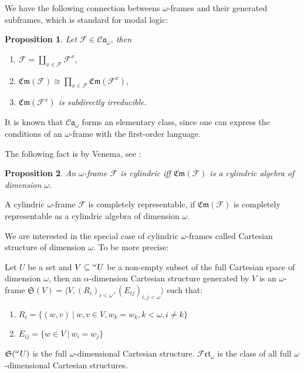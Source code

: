 \documentclass[a4paper]{article}
\theoremstyle{defin}
\theoremstyle{theorem}
\theoremstyle{claim}
\theoremstyle{prop}
\newtheorem{prop}{Proposition}
\theoremstyle{lemma}
\theoremstyle{fact}
\theoremstyle{ex}
\theoremstyle{col}
\begin{document}
We have the following connection betweens $\omega$-frames and their generated subframes, which is standard for modal logic:
\begin{prop}
Let $\mathcal{F} \in \mathcal{C}\mathfrak{a}_{\omega}$, then
\begin{enumerate}
\item $\mathcal{F} = \coprod \limits_{x \in \mathcal{F}} \mathcal{F}^{x}$,
\item $\mathfrak{Cm}(\mathcal{F}) \cong \prod \limits_{x \in \mathcal{F}} \mathfrak{Cm}(\mathcal{F}^{x})$,
\item $\mathfrak{Cm}(\mathcal{F}^{x})$ is subdirectly irreducible.
\end{enumerate}
\end{prop}

It is known that $\mathcal{C}\mathfrak{a}_{\omega}$ forms an elementary class, since one can express the conditions of an $\omega$-frame with the first-order language.

The following fact is by Venema, see \cite[Proposition 2.1.5]{Venema2013}:
\begin{prop}
An $\omega$-frame $\mathcal{F}$ is cylindric iff $\mathfrak{Cm}(\mathcal{F})$ is a cylindric algebra of dimension $\omega$.
\end{prop}
A cylindric $\omega$-frame $\mathcal{F}$ is completely representable, if $\mathfrak{Cm}(\mathcal{F})$ is completely representable as a cylindric algebra of dimension $\omega$.

We are interested in the special case of cylindric $\omega$-frames called Cartesian structure of dimension $\omega$. To be more precise:

\begin{defin}
Let $U$ be a set and $V \subseteq \prescript{\omega}{}U$ be a non-empty subset of the full Cartesian space of dimension $\omega$, then an $\alpha$-dimension Cartesian structure generated by $V$ is an $\omega$-frame $\mathfrak{S}(V) = \langle V, (R_{i})_{i < \omega}, (E_{ij})_{i, j < \omega} \rangle$ such that:
\begin{enumerate}
\item $R_i = \{ (w, v) \: | \: w, v \in V, w_k = w_k, k < \omega, i \neq k \}$
\item $E_{ij} = \{ w \in V \: | \: w_i = w_j \}$
\end{enumerate}
$\mathfrak{S}(\prescript{\omega}{}U)$ is the full $\omega$-dimensional Cartesian structure. $\mathcal{F} \mathfrak{c}\mathfrak{t}_{\omega}$ is the class of all full $\omega$-dimensional Cartesian structures.
\end{defin}
\end{document}
